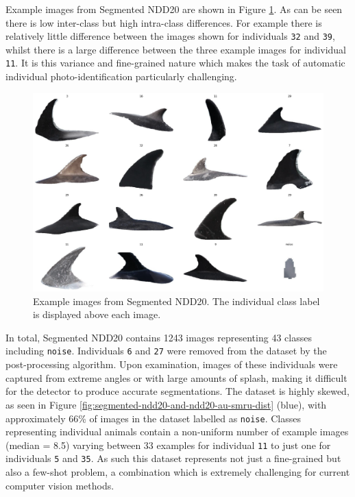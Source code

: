 Example images from Segmented NDD20 are shown in Figure \ref{fig:segmented-ndd20-example}. As can be seen there is low inter-class but high intra-class differences. For example there is relatively little difference between the images shown for individuals \texttt{32} and \texttt{39}, whilst there is a large difference between the three example images for individual \texttt{11}. It is this variance and fine-grained nature which makes the task of automatic individual photo-identification particularly challenging. 

\begin{figure}
	\begin{center}
		\includegraphics[scale=0.6]{Chapter4/figs/segmented-ndd20-tiled.png}
	\end{center}
	\caption[Example images from Segmented NDD20.]{Example images from Segmented NDD20. The individual class label is displayed above each image.}
	\label{fig:segmented-ndd20-example}
\end{figure}

In total, Segmented NDD20 contains 1243 images representing 43 classes including \texttt{noise}. Individuals \texttt{6} and \texttt{27} were removed from the dataset by the post-processing algorithm. Upon examination, images of these individuals were captured from extreme angles or with large amounts of splash, making it difficult for the detector to produce accurate segmentations. The dataset is highly skewed, as seen in Figure \ref{fig:segmented-ndd20-and-ndd20-au-smru-dist} (blue), with approximately 66\% of images in the dataset labelled as \texttt{noise}. Classes representing individual animals contain a non-uniform number of example images (median = 8.5) varying between 33 examples for individual \texttt{11} to just one for individuals \texttt{5} and \texttt{35}. As such this dataset represents not just a fine-grained but also a few-shot problem, a combination which is extremely challenging for current computer vision methods. 


